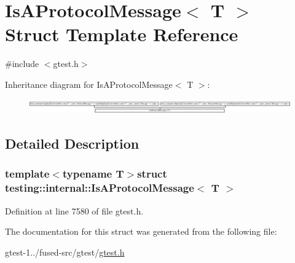\hypertarget{structtesting_1_1internal_1_1IsAProtocolMessage}{\section{\-Is\-A\-Protocol\-Message$<$ \-T $>$ \-Struct \-Template \-Reference}
\label{d9/d92/structtesting_1_1internal_1_1IsAProtocolMessage}
}


{\ttfamily \#include $<$gtest.\-h$>$}

\-Inheritance diagram for \-Is\-A\-Protocol\-Message$<$ \-T $>$\-:\begin{figure}[H]
\begin{center}
\leavevmode
\includegraphics[height=0.622914cm]{d9/d92/structtesting_1_1internal_1_1IsAProtocolMessage}
\end{center}
\end{figure}


\subsection{\-Detailed \-Description}
\subsubsection*{template$<$typename T$>$struct testing\-::internal\-::\-Is\-A\-Protocol\-Message$<$ T $>$}



\-Definition at line 7580 of file gtest.\-h.



\-The documentation for this struct was generated from the following file\-:\begin{DoxyCompactItemize}
\item 
gtest-\/1../fused-\/src/gtest/\hyperlink{fused-src_2gtest_2gtest_8h}{gtest.\-h}\end{DoxyCompactItemize}
